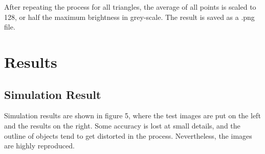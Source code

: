 \documentclass[10pt,two column]{configuration/unoesc}
\begin{document}
After repeating the process for all triangles, the average of all points is scaled to 128, or half the maximum brightness in grey-scale. The result is saved as a .png file.\\

\section{Results}

\subsection{Simulation Result}

Simulation results are shown in figure 5, where the test images are put on the left and the results on the right. Some accuracy is lost at small details, and the outline of objects tend to get distorted in the process. Nevertheless, the images are highly reproduced. \\
\end{document}
